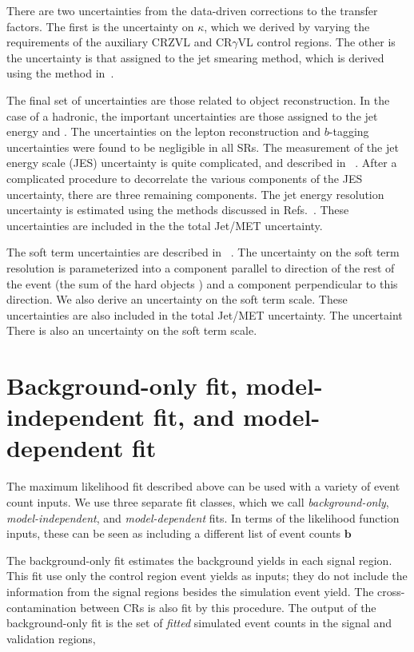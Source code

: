 There are two uncertainties from the data-driven corrections to the transfer factors.
The first is the uncertainty on $\kappa$, which we derived by varying the \met requirements of the auxiliary CRZVL and CR$\gamma$VL control regions.
The other is the uncertainty is that assigned to the jet smearing method, which is derived using the method in~\cite{SUSY-2011-20}.

The final set of uncertainties are those related to object reconstruction.
In the case of a hadronic, the important uncertainties are those assigned to the jet energy and \met.
The uncertainties on the lepton reconstruction and $b$-tagging uncertainties were found to be negligible in all SRs.
The measurement of the jet energy scale (JES) uncertainty is quite complicated, and described in ~\cite{Aad:2011he,Aad:2012vm,ATL-PHYS-PUB-2015-015}.
After a complicated procedure to decorrelate the various components of the JES uncertainty, there are three remaining components.
The jet energy resolution uncertainty is estimated using the methods discussed in Refs.~\cite{Aad:2012ag,ATL-PHYS-PUB-2015-015}.
These uncertainties are included in the the total Jet/MET uncertainty.

The \met soft term uncertainties are described in ~\cite{PERF-2014-04,ATL-PHYS-PUB-2015-023,ATL-PHYS-PUB-2015-027}.
The uncertainty on the \met soft term resolution is parameterized into a component parallel to direction of the rest of the event (the sum of the hard objects \pt) and a component perpendicular to this direction.
We also derive an uncertainty on the \met soft term scale.
These uncertainties are also included in the total Jet/MET uncertainty.
The uncertaint
There is also an uncertainty on the \met soft term scale.

\section{Background-only fit, model-independent fit, and model-dependent fit}

The maximum likelihood fit described above can be used with a variety of event count inputs.
We use three separate fit classes, which we call \textit{background-only}, \textit{model-independent}, and \textit{model-dependent} fits.
In terms of the likelihood function inputs, these can be seen as including a different list of event counts $\bm{b}$

The background-only fit estimates the background yields in each signal region.
This fit use only the control region event yields as inputs; they do not include the information from the signal regions besides the simulation event yield.
The cross-contamination between CRs is also fit by this procedure.
The output of the background-only fit is the set of \textit{fitted} simulated event counts in the signal and validation regions,

